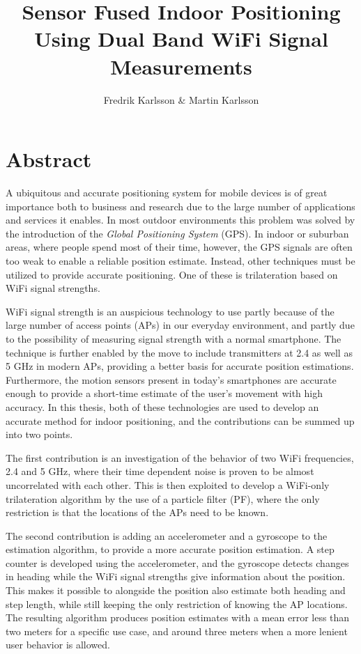 \documentclass{LTHthesis}
\begin{document}
\begin{titlepages}
\author{Fredrik Karlsson \& Martin Karlsson}
\title{Sensor Fused Indoor Positioning Using Dual Band WiFi Signal Measurements}%
\end{titlepages}
\chapter*{Abstract}
A ubiquitous and accurate positioning system for mobile devices is of great importance both to business and research due to the large number of applications and services it enables. In most outdoor environments this problem was solved by the introduction of the \emph{Global Positioning System} (GPS). In indoor or suburban areas, where people spend most of their time, however, the GPS signals are often too weak to enable a reliable position estimate. Instead, other techniques must be utilized to provide accurate positioning. One of these is trilateration based on WiFi signal strengths.

WiFi signal strength is an auspicious technology to use partly because of the large number of access points (APs) in our everyday environment, and partly due to the possibility of measuring signal strength with a normal smartphone. The technique is further enabled by the move to include transmitters at 2.4  as well as 5 GHz in modern APs, providing a better basis for accurate position estimations. Furthermore, the motion sensors present in today's smartphones are accurate enough to provide a short-time estimate of the user's movement with high accuracy. In this thesis, both of these technologies are used to develop an accurate method for indoor positioning, and the contributions can be summed up into two points.

The first contribution is an investigation of the behavior of two WiFi frequencies, 2.4 and 5 GHz, where their time dependent noise is proven to be almost uncorrelated with each other. This is then exploited to develop a WiFi-only trilateration algorithm by the use of a particle filter (PF), where the only restriction is that the locations of the APs need to be known. 

The second contribution is adding an accelerometer and a gyroscope to the estimation algorithm, to provide a more accurate position estimation. A step counter is developed using the accelerometer, and the gyroscope detects changes in heading while the WiFi signal strengths give information about the position. This makes it possible to alongside the position also estimate both heading and step length, while still keeping the only restriction of knowing the AP locations. The resulting algorithm produces position estimates with a mean error less than two meters for a specific use case, and around three meters when a more lenient user behavior is allowed. 
    
\end{document}
